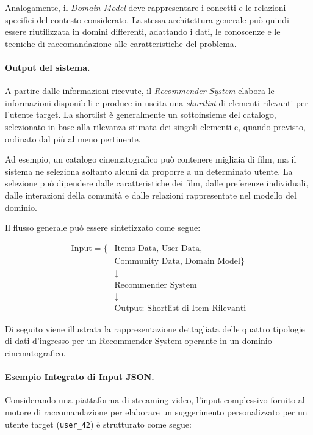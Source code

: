 Analogamente, il \textit{Domain Model} deve rappresentare i
concetti e le relazioni specifici del contesto considerato.
La stessa architettura generale può quindi essere riutilizzata
in domini differenti, adattando i dati, le conoscenze e le
tecniche di raccomandazione alle caratteristiche del problema.

\paragraph{Output del sistema.}
A partire dalle informazioni ricevute, il \textit{Recommender
System} elabora le informazioni disponibili e produce in uscita
una \textit{shortlist} di elementi rilevanti per l'utente target.
La shortlist è generalmente un sottoinsieme del catalogo,
selezionato in base alla rilevanza stimata dei singoli elementi
e, quando previsto, ordinato dal più al meno pertinente.

Ad esempio, un catalogo cinematografico può contenere migliaia
di film, ma il sistema ne seleziona soltanto alcuni da proporre
a un determinato utente. La selezione può dipendere dalle
caratteristiche dei film, dalle preferenze individuali, dalle
interazioni della comunità e dalle relazioni rappresentate nel
modello del dominio.

Il flusso generale può essere sintetizzato come segue:

\begin{equation}
\begin{aligned}
\text{Input} = \{&
\text{Items Data},\,
\text{User Data},\\
&\text{Community Data},\,
\text{Domain Model}
\}\\[4pt]
&\downarrow\\[-2pt]
&\boxed{\text{Recommender System}}\\[-2pt]
&\downarrow\\[2pt]
&\text{Output: Shortlist di Item Rilevanti}
\end{aligned}
\end{equation}

Di seguito viene illustrata la rappresentazione dettagliata delle quattro tipologie di dati d'ingresso per un Recommender System operante in un dominio cinematografico.

\paragraph{Esempio Integrato di Input JSON.}
Considerando una piattaforma di streaming video, l'input complessivo fornito al motore di raccomandazione per elaborare un suggerimento personalizzato per un utente target (\texttt{user\_42}) è strutturato come segue:


